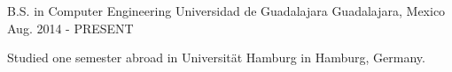\begin{cventries}
    \cventry
        {B.S. in Computer Engineering}
        {Universidad de Guadalajara}
        {Guadalajara, Mexico}
        {Aug. 2014 - PRESENT}
        {
            \begin{cvitems}
                \item {Studied one semester abroad in Universität Hamburg in Hamburg, Germany.}
            \end{cvitems}
        }
\end{cventries}

